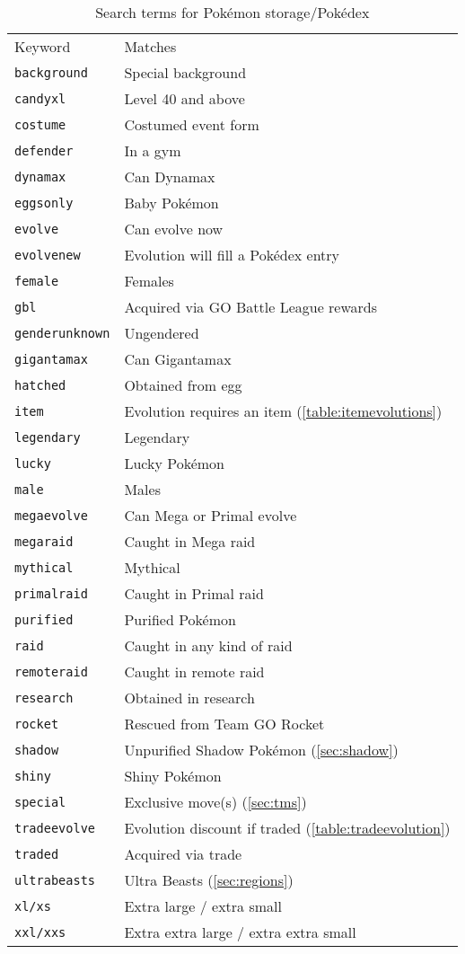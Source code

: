 \begin{table}
\centering\small
\begin{tabular}{ll}
Keyword & Matches \\
\Midrule
\texttt{background} & Special background \\
\texttt{candyxl} & Level 40 and above \\
\texttt{costume} & Costumed event form \\
\texttt{defender} & In a gym \\
\texttt{dynamax} & Can Dynamax\\
\texttt{eggsonly} & Baby Pokémon \\
\texttt{evolve} & Can evolve now\\
\texttt{evolvenew} & Evolution will fill a Pokédex entry\\
\texttt{female} & Females \\
\texttt{gbl} & Acquired via GO Battle League rewards\\
\texttt{genderunknown} & Ungendered \\
\texttt{gigantamax} & Can Gigantamax\\
\texttt{hatched} & Obtained from egg \\
\texttt{item} & Evolution requires an item (\autoref{table:itemevolutions})\\
\texttt{legendary} & Legendary \\
\texttt{lucky} & Lucky Pokémon \\
\texttt{male} & Males\\
\texttt{megaevolve} & Can Mega or Primal evolve\\
\texttt{megaraid} & Caught in Mega raid\\
\texttt{mythical} & Mythical\\
\texttt{primalraid} & Caught in Primal raid\\
\texttt{purified} & Purified Pokémon\\
\texttt{raid} & Caught in any kind of raid\\
\texttt{remoteraid} & Caught in remote raid\\
\texttt{research} & Obtained in research\\
\texttt{rocket} & Rescued from Team GO Rocket\\
\texttt{shadow} & Unpurified Shadow Pokémon (\autoref{sec:shadow})\\
\texttt{shiny} & Shiny Pokémon\\
\texttt{special} & Exclusive move(s) (\autoref{sec:tms})\\
\texttt{tradeevolve} & Evolution discount if traded (\autoref{table:tradeevolution})\\
\texttt{traded} & Acquired via trade\\
\texttt{ultrabeasts} & Ultra Beasts (\autoref{sec:regions})\\
\texttt{xl/xs} & Extra large / extra small\\
\texttt{xxl/xxs} & Extra extra large / extra extra small\\
\end{tabular}
\caption{Search terms for Pokémon storage/Pokédex\label{table:searchterms}}
\end{table}
